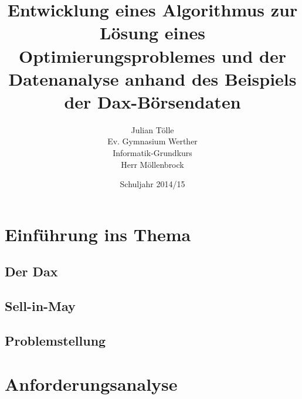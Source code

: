 \documentclass[12pt, a4paper, titlepage]{report}
\begin{document}
    \begin{titlepage}
        \title{Entwicklung eines Algorithmus zur Lösung eines Optimierungsproblemes und der Datenanalyse anhand des Beispiels der Dax-Börsendaten}
        \author{Julian Tölle\\
                Ev. Gymnasium Werther\\
                Informatik-Grundkurs\\
                Herr Möllenbrock}
        \date{Schuljahr 2014/15}

        \maketitle
    \end{titlepage}

    \tableofcontents
    \thispagestyle{empty}

    \setcounter{page}{2}

    \chapter{Einführung ins Thema}
        
        \section{Der Dax}

        \section{Sell-in-May}

        \section{Problemstellung}

    \chapter{Anforderungsanalyse}
\end{document}
